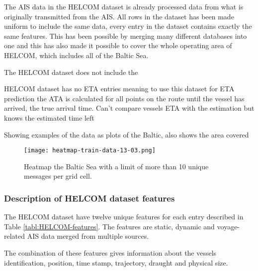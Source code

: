 \documentclass[../main.tex]{subfiles}
\begin{document}
The AIS data in the HELCOM dataset is already processed data from what is originally transmitted from the AIS. All rows in the dataset has been made uniform to include the same data, every entry in the dataset contains exactly the same features. This has been possible by merging many different databases into one and this has also made it possible to cover the whole operating area of HELCOM, which includes all of the Baltic Sea.

The HELCOM dataset does not include the 

HELCOM dataset has no ETA entries meaning to use this dataset for ETA prediction the ATA is calculated for all points on the route until the vessel has arrived, the true arrival time. Can't compare vessels ETA with the estimation but knows the estimated time left 

Showing examples of the data as plots of the Baltic, also shows the area covered

\begin{figure}[H]
\centering
\texttt{[image: heatmap-train-data-13-03.png]}
\caption{Heatmap the Baltic Sea with a limit of more than 10 unique messages per grid cell.}
\label{fig:heatmap}
\end{figure}


\subsubsection{Description of HELCOM dataset features}

The HELCOM dataset have twelve unique features for each entry described in Table \ref{tabl:HELCOM-features}. The features are static, dynamic and voyage-related AIS data merged from multiple sources.

The combination of these features gives information about the vessels identification, position, time stamp, trajectory, draught and physical size.
\end{document}
